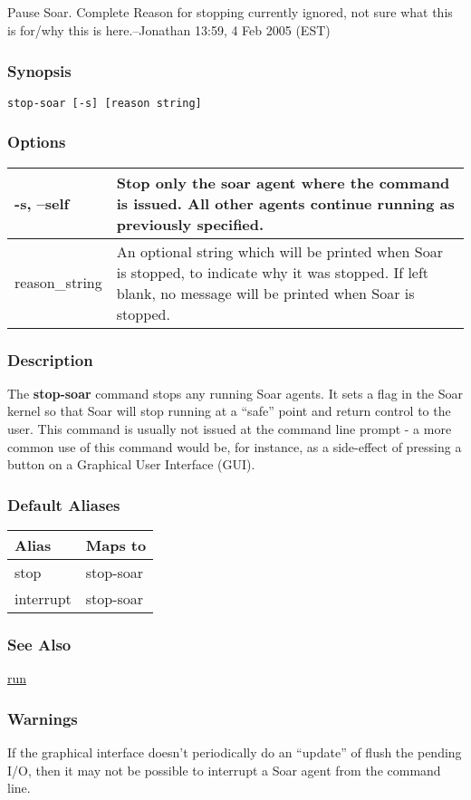 \subsection{}
\label{stop-soar}
Pause Soar. 
 Complete Reason for stopping currently ignored, not sure what this is for/why this is here.--Jonathan 13:59, 4 Feb 2005 (EST) 
\subsubsection*{Synopsis}
\begin{verbatim}
stop-soar [-s] [reason string]
\end{verbatim}
\subsubsection*{Options}
\begin{tabular}{|l|l|}
\hline 
 -s, --self  & Stop only the soar agent where the command is issued. All other agents continue running as previously specified.  \\
 \hline 
 reason\_string  & An optional string which will be printed when Soar is stopped, to indicate why it was stopped. If left blank, no message will be printed when Soar is stopped.  \\
 \hline 
\end{tabular}
\subsubsection*{Description}
 The \textbf{stop-soar}
 command stops any running Soar agents. It sets a flag in the Soar kernel so that Soar will stop running at a ``safe'' point and return control to the user. This command is usually not issued at the command line prompt - a more common use of this command would be, for instance, as a side-effect of pressing a button on a Graphical User Interface (GUI). 
\subsubsection*{Default Aliases}
\begin{tabular}{|l|l|}
\hline 
 Alias  & Maps to  \\
 \hline 
 stop  & stop-soar  \\
 \hline 
 interrupt  & stop-soar  \\
 \hline 
\end{tabular}
\subsubsection*{See Also}
\hyperref[run]{run} \subsubsection*{Warnings}
 If the graphical interface doesn't periodically do an ``update'' of flush the pending I/O, then it may not be possible to interrupt a Soar agent from the command line. 
